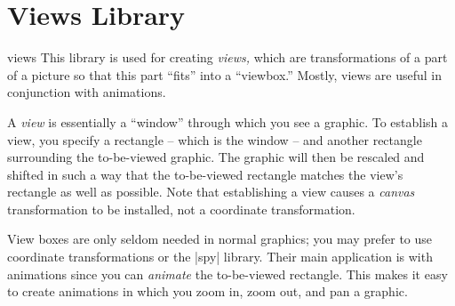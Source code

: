 %
%
%

\section{Views Library}
\label{section-library-views}


\begin{tikzlibrary}{views}
  This library is used for creating \emph{views,} which are
  transformations of a part of a picture so that this part ``fits''
  into a ``viewbox.'' Mostly, views are useful in conjunction with
  animations.
\end{tikzlibrary}

A \emph{view} is essentially a ``window'' through which you see a
graphic. To establish a view, you specify a rectangle -- which is
the window -- and another rectangle surrounding the to-be-viewed
graphic. The graphic will then be rescaled and shifted in such a way
that the to-be-viewed rectangle matches the view's rectangle as
well as possible. Note that establishing a view causes a \emph{canvas}
transformation to be installed, not a coordinate transformation.

View boxes are only seldom needed in normal graphics; you may prefer
to use coordinate transformations or the |spy| library. Their main
application is with animations since you can \emph{animate} the
to-be-viewed rectangle. This makes it easy to create animations in
which you zoom in, zoom out, and pan a graphic.

